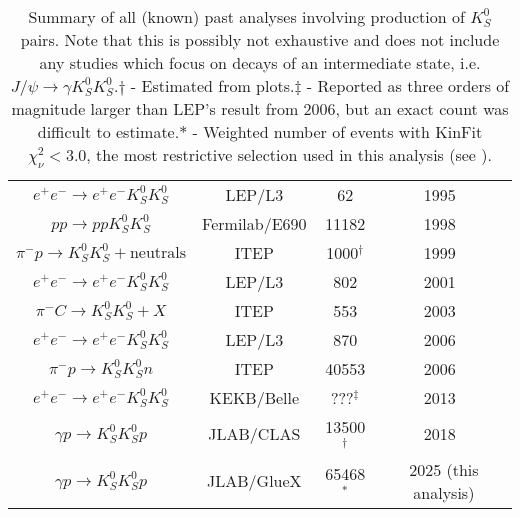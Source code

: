 \begin{table}
\begin{center}
\begin{tabular}{cccc}
$e^+e^- \to e^+e^- K_S^0 K_S^0$ & LEP/L3 & 62 & 1995~\cite{Acciarri1995}\\
$pp \to pp K_S^0 K_S^0$ & Fermilab/E690 & 11182 & 1998~\cite{Reyes1998}\\
$\pi^- p \to K_S^0 K_S^0 + \text{neutrals}$ & ITEP & 1000${}^\dagger$ & 1999~\cite{Barkov1999}\\
    $e^+e^- \to e^+e^- K_S^0 K_S^0$ & LEP/L3 & 802 & 2001~\cite{Acciarri2001}\\
  $\pi^- C \to K_S^0 K_S^0 + X$ & ITEP & 553 & 2003~\cite{Tikhomirov2003}\\
      $e^+e^- \to e^+e^- K_S^0 K_S^0$ & LEP/L3 & 870 & 2006~\cite{Schegelsky2006}\\
    $\pi^- p \to K_S^0 K_S^0 n$ & ITEP & 40553 & 2006~\cite{Vladimirsky2006}\\
    $e^+e^- \to e^+e^- K_S^0 K_S^0$ & KEKB/Belle & ???${}^\ddagger$ & 2013~\cite{Uehara2013}\\
    $\gamma p \to K_S^0 K_S^0 p$ & JLAB/CLAS & 13500${}^\dagger$ & 2018~\cite{Chandavar2018}\\
      $\gamma p \to K_S^0 K_S^0 p$ & JLAB/GlueX & 65468${}^\ast$ & 2025 (this analysis)\\\bottomrule
    \end{tabular}
    \caption{Summary of all (known) past analyses involving production of $K_S^0$ pairs. Note that this is possibly not exhaustive and does not include any studies which focus on decays of an intermediate state, i.e. $J/\psi \to \gamma K_S^0K_S^0$.\newline$\dagger$ - Estimated from plots.\newline$\ddagger$ - Reported as three orders of magnitude larger than LEP's result from 2006, but an exact count was difficult to estimate.\newline$\ast$ - Weighted number of events with KinFit $\chi^2_\nu < 3.0$, the most restrictive selection used in this analysis (see ).}\label{tab:past-analyses}
  \end{center}
\end{table}
